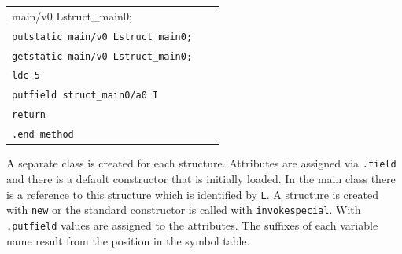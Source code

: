 \begin{table}[bth]
\begin{tabular}{|l|l|l|}
main/v0 Lstruct\_main0;} \\ \texttt{putstatic main/v0 Lstruct\_main0;} \\ \texttt{getstatic main/v0 Lstruct\_main0;} \\ \texttt{ldc 5} \\ \texttt{putfield struct\_main0/a0 I} \\ \texttt{return} \\ \texttt{.end method}} \\ \hline
\end{tabular}
\end{table}
\noindent

A separate class is created for each structure. Attributes are assigned via \texttt{.field} and there is a default constructor that is initially loaded. In the main class there is a reference to this structure which is identified by \texttt{L}. A structure is created with \texttt{new} or the standard constructor is called with \texttt{invokespecial}. With \texttt{.putfield} values are assigned to the attributes. The suffixes of each variable name result from the position in the symbol table.

\newpage

